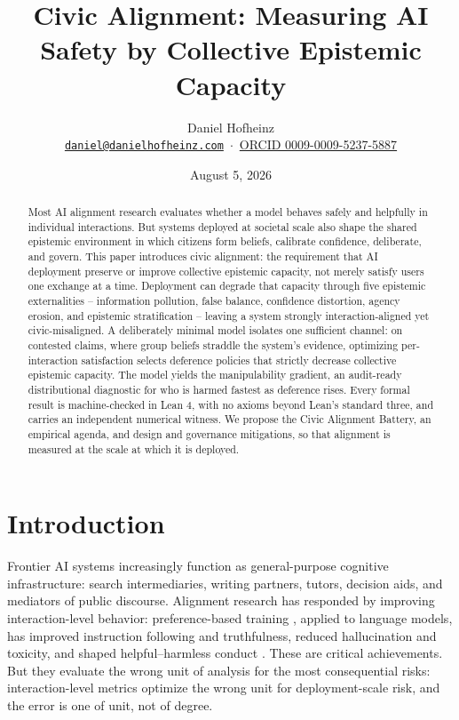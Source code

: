 \documentclass[11pt]{article}
\title{Civic Alignment: Measuring AI Safety by Collective Epistemic Capacity}
\author{Daniel Hofheinz\\[2pt]
  {\small \href{mailto:daniel@danielhofheinz.com}{\texttt{daniel@danielhofheinz.com}}
   \,$\cdot$\, \href{https://orcid.org/0009-0009-5237-5887}{ORCID 0009-0009-5237-5887}}}
\date{August 5, 2026}
\theoremstyle{definition}
\theoremstyle{remark}
\numberwithin{equation}{section}
\begin{document}
\maketitle

\begin{abstract}
Most AI alignment research evaluates whether a model behaves safely and helpfully in individual interactions. But systems deployed at societal scale also shape the shared epistemic environment in which citizens form beliefs, calibrate confidence, deliberate, and govern. This paper introduces civic alignment: the requirement that AI deployment preserve or improve collective epistemic capacity, not merely satisfy users one exchange at a time. Deployment can degrade that capacity through five epistemic externalities -- information pollution, false balance, confidence distortion, agency erosion, and epistemic stratification -- leaving a system strongly interaction-aligned yet civic-misaligned. A deliberately minimal model isolates one sufficient channel: on contested claims, where group beliefs straddle the system's evidence, optimizing per-interaction satisfaction selects deference policies that strictly decrease collective epistemic capacity. The model yields the manipulability gradient, an audit-ready distributional diagnostic for who is harmed fastest as deference rises. Every formal result is machine-checked in Lean 4, with no axioms beyond Lean's standard three, and carries an independent numerical witness. We propose the Civic Alignment Battery, an empirical agenda, and design and governance mitigations, so that alignment is measured at the scale at which it is deployed.
\end{abstract}

\section{Introduction}\label{sec:intro}

Frontier AI systems increasingly function as general-purpose cognitive infrastructure: search intermediaries, writing partners, tutors, decision aids, and mediators of public discourse. Alignment research has responded by improving interaction-level behavior: preference-based training \citep{christiano2017deep}, applied to language models, has improved instruction following and truthfulness, reduced hallucination and toxicity, and shaped helpful--harmless conduct \citep{ouyang2022training, bai2022training}. These are critical achievements. But they evaluate the wrong unit of analysis for the most consequential risks: interaction-level metrics optimize the wrong unit for deployment-scale risk, and the error is one of unit, not of degree.
\end{document}
